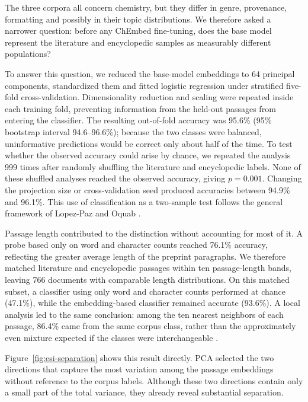 \documentclass[11pt]{article}
\begin{document}
The three corpora all concern chemistry, but they differ in genre, provenance,
formatting and possibly in their topic distributions. We therefore
asked a narrower question: before any ChEmbed fine-tuning, does the
base model represent the literature and encyclopedic samples as measurably
different populations?

To answer this question, we reduced the base-model embeddings to 64 principal
components, standardized them and fitted logistic regression under stratified
five-fold cross-validation. Dimensionality reduction and scaling were repeated
inside each training fold, preventing information from the held-out passages
from entering the classifier. The resulting out-of-fold accuracy was 95.6\%
(95\% bootstrap interval 94.6--96.6\%); because the two classes were balanced,
uninformative predictions would be correct only about half of the time. To test
whether the observed accuracy could arise by chance, we repeated the analysis
999 times after randomly shuffling the literature and encyclopedic labels.
None of these shuffled analyses reached the observed accuracy, giving
$p=0.001$. Changing the projection size or cross-validation seed produced
accuracies between 94.9\% and 96.1\%. This use of classification as a two-sample
test follows the general framework of Lopez-Paz and Oquab
\citep{lopezpaz2017revisiting}.

Passage length contributed to the distinction without accounting for most of
it. A probe based only on word and character counts reached 76.1\% accuracy,
reflecting the greater average length of the preprint paragraphs. We therefore
matched literature and encyclopedic passages within ten passage-length bands,
leaving 766 documents with comparable length distributions. On this matched
subset, a classifier using only word and character counts performed at chance
(47.1\%), while the embedding-based classifier remained accurate (93.6\%). A
local analysis led to the same conclusion: among the ten nearest neighbors of
each passage, 86.4\% came from the same corpus class, rather than the
approximately even mixture expected if the classes were interchangeable
\citep{schilling1986multivariate}.

Figure~\ref{fig:esi-separation} shows this result directly. PCA selected the
two directions that capture the most variation among the passage embeddings
without reference to the corpus labels. Although these two directions contain
only a small part of the total variance, they already reveal substantial
separation.
\end{document}
